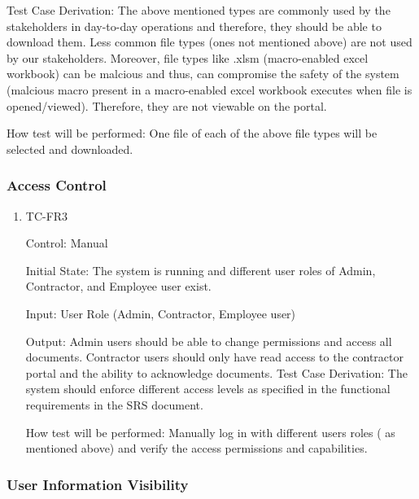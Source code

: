 \documentclass[12pt, titlepage]{article}
\begin{document}
\begin{enumerate}
    Test Case Derivation: The above mentioned types are commonly used by the
    stakeholders in day-to-day operations and therefore, they should be able to
    download them. Less common file types (ones not mentioned above) are not used by
    our stakeholders. Moreover, file types like .xlsm (macro-enabled excel
    workbook) can be malcious and thus, can compromise the safety of the system
    (malcious macro present in a macro-enabled excel workbook executes when file
    is opened/viewed). Therefore, they are not viewable on the portal.

    How test will be performed: One file of each of the above file types  will be selected and downloaded.

\end{enumerate}

\subsubsection{Access Control}

\begin{enumerate}
  \item {TC-FR3\\}

    Control: Manual

    Initial State: The system is running and different user roles of Admin,
    Contractor, and Employee user exist.

    Input: User Role (Admin, Contractor, Employee user)

    Output: Admin users should be able to change permissions and access all
    documents. Contractor users should only have read access to the contractor portal and the
    ability to acknowledge documents.
    Test Case Derivation: The system should enforce different access levels as
    specified in the functional requirements in the SRS document.

    How test will be performed: Manually log in with different users roles (
    as mentioned above) and verify the access permissions and capabilities.

\end{enumerate}

\subsubsection{User Information Visibility}
\end{document}
